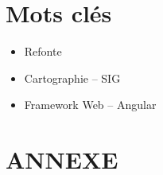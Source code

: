 \documentclass{rapportUHA40}
\begin{document}
\section*{Mots clés}
\begin{itemize}
  \item Refonte
  \item Cartographie – SIG
  \item Framework Web – Angular
\end{itemize}

\newpage

\appendix
\section{ANNEXE}
\end{document}
